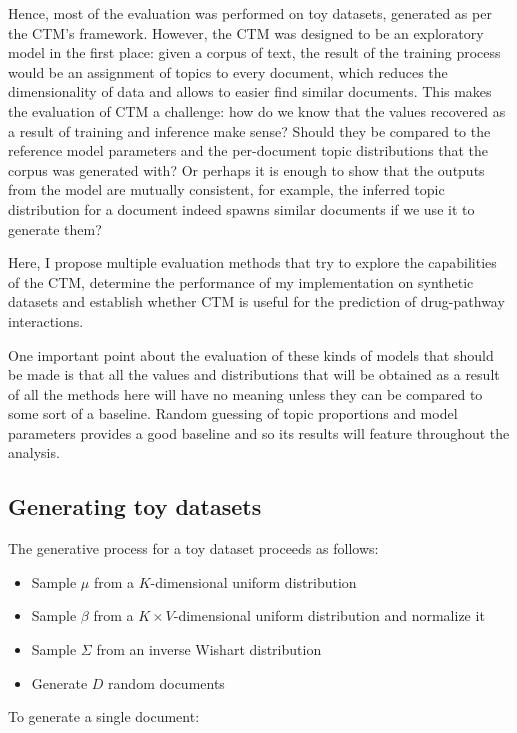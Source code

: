 \documentclass[12pt,a4paper,twoside,openright]{report}
\begin{document}
Hence, most of the evaluation was performed on toy datasets, generated as per the CTM's framework. However, the CTM was designed to be an exploratory model in the first place: given a corpus of text, the result of the training process would be an assignment of topics to every document, which reduces the dimensionality of data and allows to easier find similar documents. This makes the evaluation of CTM a challenge: how do we know that the values recovered as a result of training and inference make sense? Should they be compared to the reference model parameters and the per-document topic distributions that the corpus was generated with? Or perhaps it is enough to show that the outputs from the model are mutually consistent, for example, the inferred topic distribution for a document indeed spawns similar documents if we use it to generate them?

Here, I propose multiple evaluation methods that try to explore the capabilities of the CTM, determine the performance of my implementation on synthetic datasets and establish whether CTM is useful for the prediction of drug-pathway interactions.

One important point about the evaluation of these kinds of models that should be made is that all the values and distributions that will be obtained as a result of all the methods here will have no meaning unless they can be compared to some sort of a baseline. Random guessing of topic proportions and model parameters provides a good baseline and so its results will feature throughout the analysis.

\subsection{Generating toy datasets}

The generative process for a toy dataset proceeds as follows:

\begin{itemize}[noitemsep]
\item Sample $\mu$ from a $K$-dimensional uniform distribution
\item Sample $\beta$ from a $K \times V$-dimensional uniform distribution and normalize it
\item Sample $\Sigma$ from an inverse Wishart distribution
\item Generate $D$ random documents
\end{itemize}

To generate a single document:
\end{document}
